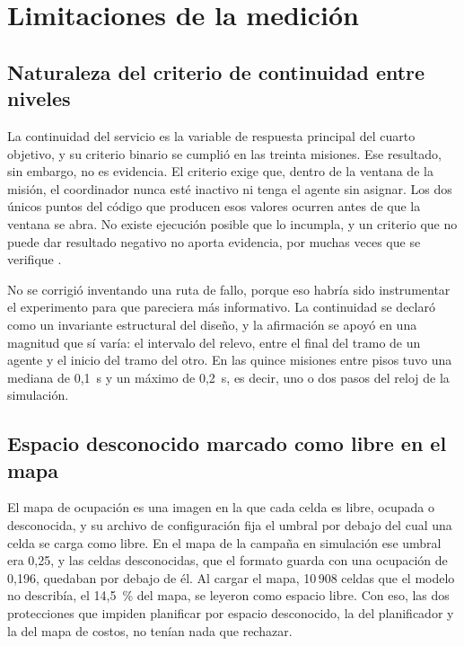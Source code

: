 \section{Limitaciones de la medición}
\label{sec:limitaciones}

\subsection{Naturaleza del criterio de continuidad entre niveles}

La continuidad del servicio es la variable de respuesta principal del cuarto
objetivo, y su criterio binario se cumplió en las treinta misiones. Ese resultado,
sin embargo, no es evidencia. El criterio exige que, dentro de la ventana de la
misión, el coordinador nunca esté inactivo ni tenga el agente sin asignar. Los dos únicos puntos del código que producen esos valores ocurren antes de que la
ventana se abra. No existe ejecución posible que lo incumpla, y un criterio que no
puede dar resultado negativo no aporta evidencia, por muchas veces que se
verifique \autocite{popper1959logic}.

No se corrigió inventando una ruta de fallo, porque eso habría sido
instrumentar el experimento para que pareciera más informativo. La continuidad
se declaró como un invariante estructural del diseño, y la afirmación se apoyó en
una magnitud que sí varía: el intervalo del relevo, entre el final del tramo de un
agente y el inicio del tramo del otro. En las quince misiones entre pisos tuvo
una mediana de 0,1~s y un máximo de 0,2~s, es decir, uno o dos pasos del reloj de
la simulación.

\subsection{Espacio desconocido marcado como libre en el mapa}

El mapa de ocupación es una imagen en la que cada celda es libre, ocupada o desconocida, y su archivo de configuración fija el umbral por debajo del cual una celda se carga como libre. En el mapa de la campaña en simulación ese umbral era 0,25, y las celdas desconocidas, que el formato guarda con una ocupación de 0,196, quedaban por debajo de él. Al cargar el mapa, 10\,908 celdas que el modelo no describía, el 14,5~\% del mapa, se leyeron como espacio libre. Con eso, las dos protecciones que impiden planificar por espacio desconocido, la del planificador y la del mapa de costos, no tenían nada que rechazar.

